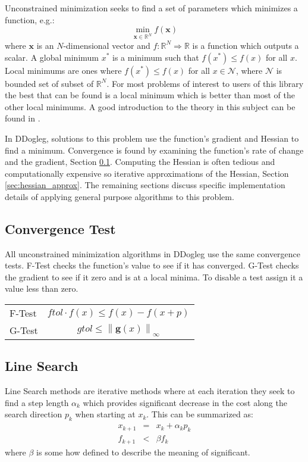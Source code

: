 \documentclass[peerreview,compsoc,onecolumn]{IEEEtran}
\newcommand{\R}{\mathbb{R}}
\newcommand{\norm}[1]{\left\lVert#1\right\rVert}
\begin{document}
Unconstrained minimization seeks to find a set of parameters which minimizes a function, e.g.:
\begin{equation}
\min\limits_{\bm{x} \in \R^N} f(\bm{x})
\end{equation}
where $\bm{x}$ is an $N$-dimensional vector and $f : \R^N \Rightarrow \R $ is a function which outputs a scalar. A global minimum $x^*$ is a minimum such that $f(x^*) \le f(x)$ for all $x$. Local minimums are ones where $f(x^*) \le f(x)$ for all $x \in \mathcal{N}$, where $\mathcal{N}$ is bounded set of subset of $\R^N$. For most problems of interest to users of this library the best that can be found is a local minimum which is better than most of the other local minimums. A good introduction to the theory in this subject can be found in \cite{numopt2006}.

In DDogleg, solutions to this problem use the function's gradient and Hessian to find a minimum. Convergence is found by examining the function's rate of change and the gradient, Section \ref{sec:unmin_convergence}. Computing the Hessian is often tedious and computationally expensive so iterative approximations of the Hessian, Section \ref{sec:hessian_approx}. The remaining sections discuss specific implementation details of applying general purpose algorithms to this problem.

\subsection{Convergence Test}
\label{sec:unmin_convergence}

All unconstrained minimization algorithms in DDogleg use the same convergence tests. F-Test checks the function's value to see if it has converged. G-Test checks the gradient to see if it zero and is at a local minima. To disable a test assign it a value less than zero.

\begin{center}
\begin{tabular}{lc}
F-Test & $ftol \cdot f(x)  \leq f(x) - f(x+p)$ \\
G-Test & $gtol \leq \norm{\bm{g}(x)}_\infty$ 
\end{tabular}
\end{center}
 
\subsection{Line Search}

Line Search methods are iterative methods where at each iteration they seek to find a step length $\alpha_k$ which provides significant decrease in the cost along the search direction $p_k$ when starting at $x_k$. This can be summarized as:
\begin{eqnarray}
x_{k+1} & = & x_k + \alpha_k p_k \\
f_{k+1} & < & \beta f_k
\end{eqnarray}
where $\beta$ is some how defined to describe the meaning of significant.
\end{document}
